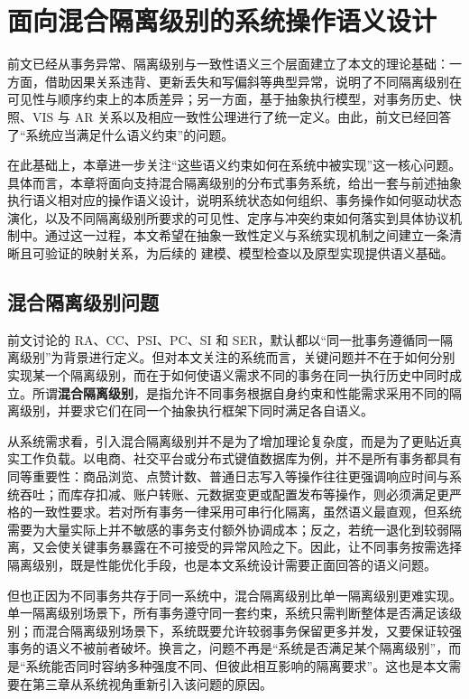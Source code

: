 \chapter{面向混合隔离级别的系统操作语义设计}

前文已经从事务异常、隔离级别与一致性语义三个层面建立了本文的理论基础：一方面，借助因果关系违背、更新丢失和写偏斜等典型异常，说明了不同隔离级别在可见性与顺序约束上的本质差异；另一方面，基于抽象执行模型，对事务历史、快照、$\text{VIS}$ 与 $\text{AR}$ 关系以及相应一致性公理进行了统一定义。由此，前文已经回答了“系统应当满足什么语义约束”的问题。

在此基础上，本章进一步关注“这些语义约束如何在系统中被实现”这一核心问题。具体而言，本章将面向支持混合隔离级别的分布式事务系统，给出一套与前述抽象执行语义相对应的操作语义设计，说明系统状态如何组织、事务操作如何驱动状态演化，以及不同隔离级别所要求的可见性、定序与冲突约束如何落实到具体协议机制中。通过这一过程，本文希望在抽象一致性定义与系统实现机制之间建立一条清晰且可验证的映射关系，为后续的 \TLAPlus 建模、模型检查以及原型实现提供语义基础。

\section{混合隔离级别问题}
前文讨论的 RA、CC、PSI、PC、SI 和 SER，默认都以“同一批事务遵循同一隔离级别”为背景进行定义。但对本文关注的系统而言，关键问题并不在于如何分别实现某一个隔离级别，而在于如何使语义需求不同的事务在同一执行历史中同时成立。所谓\textbf{混合隔离级别}，是指允许不同事务根据自身约束和性能需求采用不同的隔离级别，并要求它们在同一个抽象执行框架下同时满足各自语义。

从系统需求看，引入混合隔离级别并不是为了增加理论复杂度，而是为了更贴近真实工作负载\cite{Terry2013}。以电商、社交平台或分布式键值数据库为例，并不是所有事务都具有同等重要性：商品浏览、点赞计数、普通日志写入等操作往往更强调响应时间与系统吞吐；而库存扣减、账户转账、元数据变更或配置发布等操作，则必须满足更严格的一致性要求。若对所有事务一律采用可串行化隔离，虽然语义最直观，但系统需要为大量实际上并不敏感的事务支付额外协调成本；反之，若统一退化到较弱隔离，又会使关键事务暴露在不可接受的异常风险之下。因此，让不同事务按需选择隔离级别，既是性能优化手段，也是本文系统设计需要正面回答的语义问题。

但也正因为不同事务共存于同一系统中，混合隔离级别比单一隔离级别更难实现。单一隔离级别场景下，所有事务遵守同一套约束，系统只需判断整体是否满足该级别；而混合隔离级别场景下，系统既要允许较弱事务保留更多并发，又要保证较强事务的语义不被前者破坏。换言之，问题不再是“系统是否满足某个隔离级别”，而是“系统能否同时容纳多种强度不同、但彼此相互影响的隔离要求”。这也是本文需要在第三章从系统视角重新引入该问题的原因。

